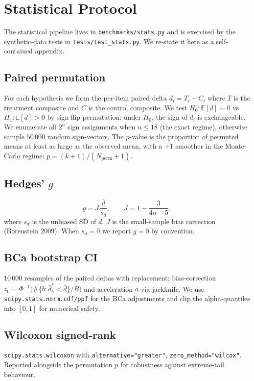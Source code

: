 \section{Statistical Protocol}\label{app:stats}

\sloppy

The statistical pipeline lives in \texttt{benchmarks/stats.py} and is exercised by the synthetic-data tests in \texttt{tests/test\_stats.py}. We re-state it here as a self-contained appendix.

\subsection{Paired permutation}
For each hypothesis we form the per-item paired delta $d_i = T_i - C_i$ where $T$ is the treatment composite and $C$ is the control composite. We test $H_0: \mathbb{E}[d] = 0$ vs $H_1: \mathbb{E}[d] > 0$ by sign-flip permutation: under $H_0$, the sign of $d_i$ is exchangeable. We enumerate all $2^n$ sign assignments when $n \leq 18$ (the exact regime), otherwise sample $50\,000$ random sign-vectors. The $p$-value is the proportion of permuted means at least as large as the observed mean, with a $+1$ smoother in the Monte-Carlo regime: $p = (k+1)/(N_{\text{perm}}+1)$.

\subsection{Hedges' $g$}
\[
g = J\,\frac{\bar d}{s_d},\qquad J = 1 - \frac{3}{4n - 5},
\]
where $s_d$ is the unbiased SD of $d$. $J$ is the small-sample bias correction (Borenstein 2009). When $s_d = 0$ we report $g=0$ by convention.

\subsection{BCa bootstrap CI}
$10\,000$ resamples of the paired deltas with replacement; bias-correction $z_0 = \Phi^{-1}\bigl(\#\{b : \bar d^*_b < \bar d\}/B\bigr)$ and acceleration $a$ via jackknife. We use \texttt{scipy.stats.norm.cdf/ppf} for the BCa adjustments and clip the alpha-quantiles into $[0, 1]$ for numerical safety.

\subsection{Wilcoxon signed-rank}
\texttt{scipy.stats.wilcoxon} with \texttt{alternative="greater"}, \texttt{zero\_method="wilcox"}. Reported alongside the permutation $p$ for robustness against extreme-tail behaviour.

